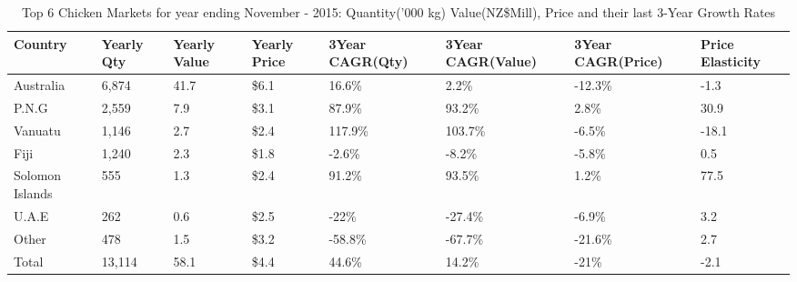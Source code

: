 \begin{table}[ht]
\centering
{\scriptsize
\begin{tabular}[t]{p{1.8cm}>{\hfill}p{1.4cm}>{\hfill}p{1.4cm}>{\hfill}p{1.6cm}>{\hfill}p{1.9cm}>{\hfill}p{2cm}>{\hfill}p{1.9cm}>{\hfill}p{1.5cm}}
 \textbf{Country} & \textbf{Yearly Qty} & \textbf{Yearly Value} & \textbf{Yearly Price} & \textbf{3Year CAGR(Qty)} & \textbf{3Year CAGR(Value)} & \textbf{3Year CAGR(Price)} & \textbf{Price Elasticity} \\
\hline
Australia & 6,874 & 41.7 & \$6.1 & 16.6\% & 2.2\% & -12.3\% & -1.3 \\  
P.N.G & 2,559 & 7.9 & \$3.1 & 87.9\% & 93.2\% & 2.8\% & 30.9 \\  
Vanuatu & 1,146 & 2.7 & \$2.4 & 117.9\% & 103.7\% & -6.5\% & -18.1 \\  
Fiji & 1,240 & 2.3 & \$1.8 & -2.6\% & -8.2\% & -5.8\% & 0.5 \\  
Solomon Islands & 555 & 1.3 & \$2.4 & 91.2\% & 93.5\% & 1.2\% & 77.5 \\  
U.A.E & 262 & 0.6 & \$2.5 & -22\% & -27.4\% & -6.9\% & 3.2 \\  
Other & 478 & 1.5 & \$3.2 & -58.8\% & -67.7\% & -21.6\% & 2.7 \\  
Total & 13,114 & 58.1 & \$4.4 & 44.6\% & 14.2\% & -21\% & -2.1 \\  
\hline
\end{tabular}
}
\caption{\scriptsize Top 6 Chicken Markets for year ending November - 2015: Quantity('000 kg) Value(NZ\$Mill), Price and their last 3-Year Growth Rates}
\end{table}

